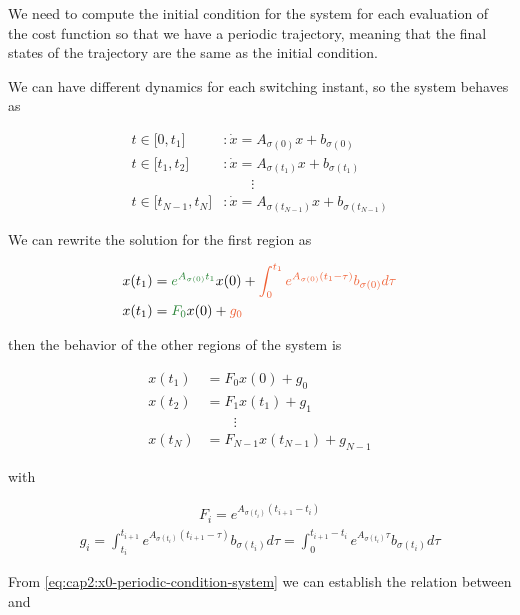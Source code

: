 We need to compute the initial condition for the system for each evaluation of the cost 
function so that we have a periodic trajectory, meaning that the final states of the trajectory
are the same as the initial condition.

We can have different dynamics for each switching instant, so the system behaves as 

\begin{align}
    t \in \big[0, t_1\big]   &: \dot{x}= A_{\sigma(0)} x + b_{\sigma(0)}  \nonumber \\
    t \in \big[t_1, t_2\big] &: \dot{x}= A_{\sigma(t_1)} x + b_{\sigma(t_1)} \nonumber \\
    &\qquad \vdots \nonumber \\
    t \in \big[t_{N-1}, t_N\big] &: \dot{x}= A_{\sigma(t_{N-1})} x + b_{\sigma(t_{N-1})}
\end{align}

We can rewrite the solution for the first region as

\noindent
\begin{align}
    x(t_1) &= \green{e^{A_{\sigma(0)} t_1}} x(0) + 
            \orange{\int_{0}^{t_1}{e^{A_{\sigma(0)}(t_1 - \tau)} b_{\sigma(0)} d\tau}} \nonumber \\
    x(t_1) &= \green{F_0} x(0) + \orange{g_0}
\end{align}

\noindent
then the behavior of the other regions of the system is

\noindent
\begin{align}
    x(t_1) &= F_0 x(0) + g_0 \nonumber \\
    x(t_2) &= F_1 x(t_1) + g_1 \nonumber \\
    &\qquad \vdots \nonumber \\ 
    x(t_N) &= F_{N-1} x(t_{N-1}) + g_{N-1}
    \label{eq:cap2:x0-periodic-condition-system}
\end{align}

\noindent
with

\noindent
\begin{align}
    F_i = e^{A_{\sigma(t_i)}(t_{i+1} - t_i)} 
\end{align}
\begin{align}
    g_i = \int_{t_i}^{t_{i+1}}{e^{A_{\sigma(t_i)}(t_{i+1} - \tau)} b_{\sigma(t_i)} d\tau} = 
    \int_{0}^{t_{i+1} - t_i}{e^{A_{\sigma(t_i)}\tau} b_{\sigma(t_i)} d\tau}
\end{align}

From \eqref{eq:cap2:x0-periodic-condition-system} we can establish the relation between  and 



